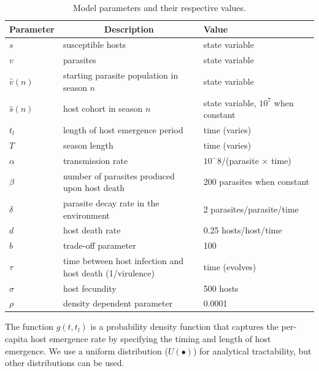 \documentclass{article}
\begin{document}
\begin{table}
\begin{tabular}{ |p{0.5cm} p{9.5cm} p{5cm}| }
 \hline
\textbf{Parameter} & \multicolumn{1}{c}{\textbf{Description}} & {\textbf{Value}} \\
 \hline
 $s$ & susceptible hosts & state variable\\

 $v$ & parasites & state variable\\

 $\hat{v}(n)$ & starting parasite population in season $n$ & state variable\\

 $\hat{s}(n)$ & host cohort in season $n$ & state variable, $10^7$ when constant\\

 $t_{l}$ & length of host emergence period & time (varies)\\

 $T$ & season length & time (varies)\\

 $\alpha$ & transmission rate & $10^-8$/(parasite $\times$ time)\\

 $\beta$ & number of parasites produced upon host death & 200 parasites when constant\\

 $\delta$ & parasite decay rate in the environment  & 2 parasites/parasite/time\\

 $d$ & host death rate & 0.25 hosts/host/time\\

 $b$ & trade-off parameter & 100\\

 $\tau$ & time between host infection and host death (1/virulence) & time (evolves)\\

 $\sigma$ & host fecundity & 500 hosts\\

 $\rho$ & density dependent parameter & 0.0001\\
 \hline
\end{tabular}
\caption{Model parameters and their respective values.}
\end{table}

\noindent The function $g(t,t_{l})$ is a probability density function that captures the per-capita host emergence rate by specifying the timing and length of host emergence. We use a uniform distribution ($U(\bullet)$) for analytical tractability, but other distributions can be used.
\end{document}
